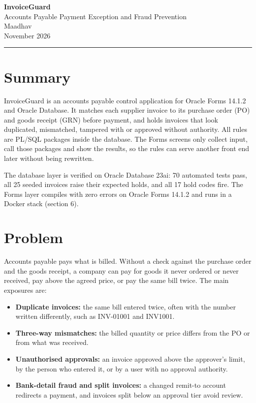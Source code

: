 \documentclass[10pt,a4paper]{article}
\begin{document}
\begin{center}
  {\LARGE\bfseries InvoiceGuard}\\[3pt]
  {\large Accounts Payable Payment Exception and Fraud Prevention}\\[8pt]
  Maadhav\\
  November 2026
\end{center}
\noindent\rule{\linewidth}{0.4pt}

\section{Summary}

InvoiceGuard is an accounts payable control application for Oracle Forms 14.1.2 and Oracle Database. It matches each supplier invoice to its purchase order (PO) and goods receipt (GRN) before payment, and holds invoices that look duplicated, mismatched, tampered with or approved without authority. All rules are PL/SQL packages inside the database. The Forms screens only collect input, call those packages and show the results, so the rules can serve another front end later without being rewritten.

The database layer is verified on Oracle Database 23ai: 70 automated tests pass, all 25 seeded invoices raise their expected holds, and all 17 hold codes fire. The Forms layer compiles with zero errors on Oracle Forms 14.1.2 and runs in a Docker stack (section 6).

\section{Problem}

Accounts payable pays what is billed. Without a check against the purchase order and the goods receipt, a company can pay for goods it never ordered or never received, pay above the agreed price, or pay the same bill twice. The main exposures are:

\begin{itemize}[leftmargin=1.2em,itemsep=2pt]
  \item \textbf{Duplicate invoices:} the same bill entered twice, often with the number written differently, such as INV-01001 and INV1001.
  \item \textbf{Three-way mismatches:} the billed quantity or price differs from the PO or from what was received.
  \item \textbf{Unauthorised approvals:} an invoice approved above the approver's limit, by the person who entered it, or by a user with no approval authority.
  \item \textbf{Bank-detail fraud and split invoices:} a changed remit-to account redirects a payment, and invoices split below an approval tier avoid review.
\end{itemize}
\end{document}
